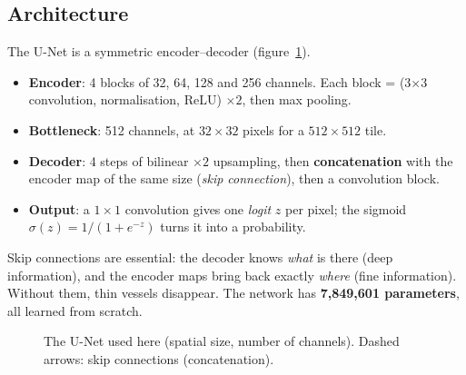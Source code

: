 \documentclass[11pt,a4paper]{article}
\begin{document}
\subsection{Architecture}
The U-Net \cite{unet} is a symmetric encoder--decoder (figure~\ref{fig:unet}).
\begin{itemize}
  \item \textbf{Encoder}: 4 blocks of 32, 64, 128 and 256 channels. Each block = (3$\times$3 convolution, normalisation, ReLU) $\times 2$, then max pooling.
  \item \textbf{Bottleneck}: 512 channels, at $32\times32$ pixels for a $512\times512$ tile.
  \item \textbf{Decoder}: 4 steps of bilinear $\times2$ upsampling, then \textbf{concatenation} with the encoder map of the same size (\emph{skip connection}), then a convolution block.
  \item \textbf{Output}: a $1\times1$ convolution gives one \emph{logit} $z$ per pixel; the sigmoid $\sigma(z)=1/(1+e^{-z})$ turns it into a probability.
\end{itemize}
Skip connections are essential: the decoder knows \emph{what} is there (deep information), and the encoder maps bring back exactly \emph{where} (fine information). Without them, thin vessels disappear. The network has \textbf{7{,}849{,}601 parameters}, all learned from scratch.

\begin{figure}[h]
\centering
{}
\caption{The U-Net used here (spatial size, number of channels). Dashed arrows: skip connections (concatenation).}
\label{fig:unet}
\end{figure}
\end{document}

